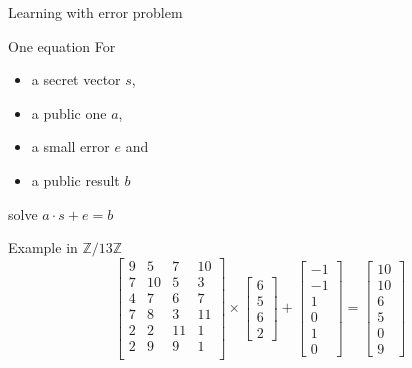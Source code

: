 \documentclass{beamer}
\begin{document}
\begin{frame}{Learning with error problem}
	\begin{block}{One equation}
		For\begin{itemize}
			\item a secret vector $s$,
			\item a public one $a$,
			\item a small error $e$ and
			\item a public result $b$
		\end{itemize} solve $ a \cdot s + e = b$
	\end{block}
	\pause
	Example in $\mathbb{Z}/13\mathbb{Z}$
	\[
		\left[\begin{matrix}
			9 & 5 & 7 & 10 \\
			7 & 10 & 5 & 3 \\
			4 & 7 & 6 & 7 \\
			7 & 8 & 3 & 11 \\
			2 & 2 & 11 & 1 \\
			2 & 9 & 9 & 1 \\
		\end{matrix}\right]
		\times
		\left[\begin{matrix}
			6 \\ 5 \\ 6 \\ 2
		\end{matrix}\right]
		+
		\left[\begin{matrix} -1 \\ -1 \\ 1 \\ 0 \\ 1 \\ 0 \end{matrix}\right]
		=
		\left[\begin{matrix} 10 \\ 10 \\ 6 \\ 5 \\ 0 \\ 9 \end{matrix}\right]
	\]
\end{frame}
\end{document}
